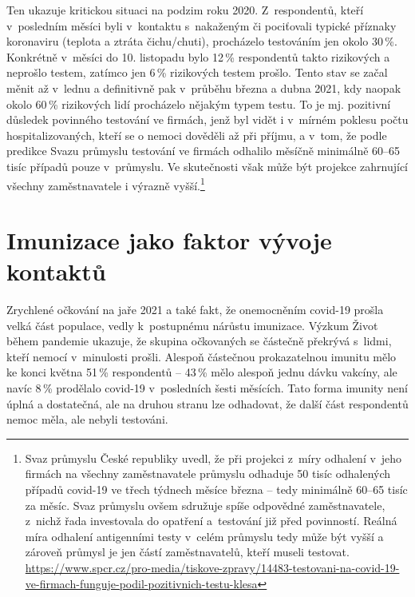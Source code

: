Ten ukazuje kritickou situaci na podzim roku 2020. Z respondentů, kteří v posledním měsíci byli v kontaktu s nakaženým či pociťovali typické příznaky koronaviru (teplota a ztráta čichu/chuti), procházelo testováním jen okolo 30\,\%. Konkrétně v měsíci do 10. listopadu bylo 12\,\% respondentů takto rizikových a neprošlo testem, zatímco jen 6\,\% rizikových testem prošlo. Tento stav se začal měnit až v lednu a definitivně pak v průběhu března a dubna 2021, kdy naopak okolo 60\,\% rizikových lidí procházelo nějakým typem testu. To je mj. pozitivní důsledek
povinného testování ve firmách, jenž byl vidět i v mírném poklesu počtu hospitalizovaných, kteří se o nemoci dověděli až při příjmu, a v tom, že podle predikce Svazu průmyslu testování ve firmách odhalilo měsíčně minimálně 60--65 tisíc případů pouze v průmyslu. Ve skutečnosti však může být projekce zahrnující všechny zaměstnavatele i výrazně vyšší.\footnote{Svaz průmyslu České republiky uvedl, že při projekci z míry odhalení v jeho firmách na všechny zaměstnavatele průmyslu odhaduje 50 tisíc odhalených případů covid-19 ve třech týdnech měsíce března – tedy minimálně 60--65 tisíc za měsíc. Svaz průmyslu ovšem sdružuje spíše odpovědné zaměstnavatele, z nichž řada investovala do opatření a testování již před povinností. Reálná míra odhalení antigenními testy v celém průmyslu tedy může být vyšší a zároveň průmysl je jen částí zaměstnavatelů, kteří museli testovat. \url{https://www.spcr.cz/pro-media/tiskove-zpravy/14483-testovani-na-covid-19-ve-firmach-funguje-podil-pozitivnich-testu-klesa}}

\section*{Imunizace jako faktor vývoje kontaktů}

Zrychlené očkování na jaře 2021 a také fakt, že onemocněním covid-19 prošla velká část populace, vedly k postupnému nárůstu imunizace. Výzkum Život během pandemie ukazuje, že skupina očkovaných se částečně překrývá s lidmi, kteří nemocí v minulosti prošli. Alespoň částečnou prokazatelnou imunitu mělo ke konci května 51\,\% respondentů – 43\,\% mělo alespoň jednu dávku vakcíny, ale navíc 8\,\% prodělalo covid-19 v posledních šesti měsících. Tato forma imunity není úplná a dostatečná, ale na druhou stranu lze odhadovat, že další část respondentů nemoc měla, ale nebyli testováni.

